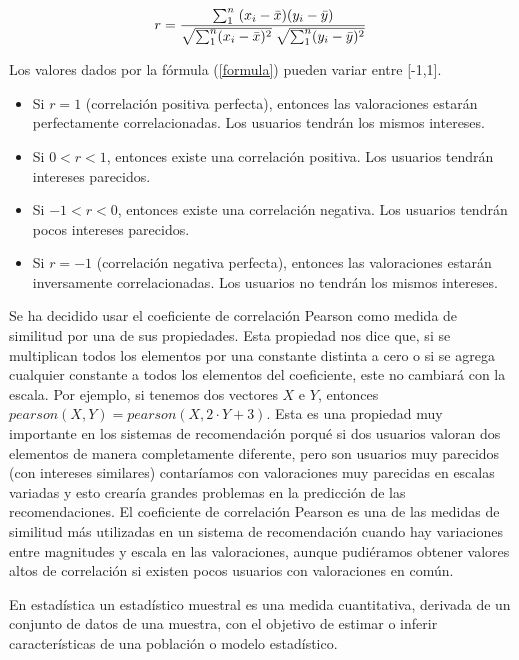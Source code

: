 \documentclass{uimppracticas}
\begin{document}
\begin{equation}\label{formula}
	\large r = \frac{\sum_{1}^{n} \; (x_{i} - \bar{x}) (y_{i} - \bar{y})}{\sqrt{\sum_{1}^{n}(x_{i} - \bar{x})^2} \; \sqrt{\sum_{1}^{n}(y_{i} - \bar{y})^2}}
\end{equation}

Los valores dados por la fórmula (\ref{formula}) pueden variar entre [-1,1].

\begin{itemize}
	\item Si $r=1$ (correlación positiva perfecta), entonces las valoraciones estarán perfectamente correlacionadas. Los usuarios tendrán los mismos intereses.
	\item Si $0<r<1$, entonces existe una correlación positiva. Los usuarios tendrán intereses parecidos.
	\item Si $-1<r<0$, entonces existe una correlación negativa. Los usuarios tendrán pocos intereses parecidos.
	\item Si $r=-1$ (correlación negativa perfecta), entonces las valoraciones estarán inversamente correlacionadas. Los usuarios no tendrán los mismos intereses.
\end{itemize}

Se ha decidido usar el coeficiente de correlación Pearson como medida de similitud por una de sus propiedades. Esta propiedad nos dice que, si se multiplican todos los elementos por una constante distinta a cero o si se agrega cualquier constante a todos los elementos del coeficiente, este no cambiará con la escala. Por ejemplo, si tenemos dos vectores $X$ e $Y$, entonces $pearson(X,Y) = pearson(X,2\cdot Y+3)$. Esta es una propiedad muy importante en los sistemas de recomendación porqué si dos usuarios valoran dos elementos de manera completamente diferente, pero son usuarios muy parecidos (con intereses similares) contaríamos con valoraciones muy parecidas en escalas variadas y esto crearía grandes problemas en la predicción de las recomendaciones. El coeficiente de correlación Pearson es una de las medidas de similitud más utilizadas en un sistema de recomendación cuando hay variaciones entre magnitudes y escala en las valoraciones, aunque pudiéramos obtener valores altos de correlación si existen pocos usuarios con valoraciones en común.

\begin{definition}\label{estadístico_muestral}
En estadística un estadístico muestral es una medida cuantitativa, derivada de un conjunto de datos de una muestra, con el objetivo de estimar o inferir características de una población o modelo estadístico.
\end{definition}
\end{document}
